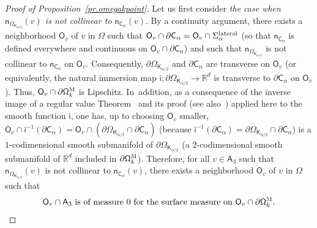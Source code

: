 \documentclass[JEP,XML,SOM,Unicode,NoEqCountersInSection,NoFloatCountersInSection,published]{cedram}
\let\pa\partial
\theoremstyle{plain}
\theoremstyle{definition}
\begin{document}
\begin{proof}[Proof of Proposition~\ref{pr.omegakpoint}]
Let us first consider \emph{the case when $\mathsf n_{\Omega_{\mathsf K_{\alpha/2}}}(v)$ is not collinear to $\mathsf n_{\mathsf C_\alpha}(v)$}. By a continuity argument, there exists a neighborhood $\mathsf O_v$ of $v$ in $\Omega$ such that $\mathsf O_v\cap \pa \mathsf C_\alpha=\mathsf O_v\cap \Sigma_\alpha^{\textup{lateral}}$ (so that $\mathsf n_{\mathsf C_\alpha}$ is defined everywhere and continuous on $\mathsf O_v\cap \pa \mathsf C_\alpha$) and such that $\mathsf n_{\Omega_{\mathsf K_{\alpha/2}}}$ is not collinear to $\mathsf n_{\mathsf C_\alpha}$ on $\mathsf O_v$. Consequently, $ \partial \Omega_{\mathsf K_{\alpha/2}}$ and $ \pa \mathsf C_\alpha$ are transverse on $\mathsf O_v$ (or equivalently, the natural immersion map $\mathsf i: \partial \Omega_{\mathsf K_{\alpha/2}}\to \mathbb R^d$ is transverse to $ \pa \mathsf C_\alpha$ on $\mathsf O_v$). Thus, $\mathsf O_v\cap \pa \mathsf \Omega_k^{\textsc{M}}$ is Lipschitz. In~addition, as a consequence of the inverse image of a regular value Theorem~\cite[Th.\,(5.12)]{brocker1982introduction} and its proof (see also~\cite{thom1954quelques,milnor1997topology,guillemin2010differential})
applied here to the smooth function $\mathsf i$, one has, up to choosing $\mathsf O_v$ smaller, $\mathsf O_v \cap \mathsf i^{-1}(\pa \mathsf C_\alpha)= \mathsf O_v\cap (\partial \Omega_{\mathsf K_{\alpha/2}}\cap \pa \mathsf C_\alpha)$ (because $\mathsf i^{-1}(\pa \mathsf C_\alpha)= \partial \Omega_{\mathsf K_{\alpha/2}}\cap \pa \mathsf C_\alpha$) is a $1$-codimensional smooth submanifold of $\partial \Omega_{\mathsf K_{\alpha/2}}$ (\ie a $2$-codimensional smooth submanifold of $\mathbb R^d$ included in $\pa \mathsf \Omega_k^{\textsc{M}}$).
Therefore, for all $v\in \mathsf A_3$ such that $\mathsf n_{\Omega_{\mathsf K_{\alpha/2}}}(v)$ is not collinear to $\mathsf n_{\mathsf C_\alpha}(v)$, there exists a neighborhood $\mathsf O_v$ of $v$ in $\Omega$ such that
\begin{equation}\label{eq.point1A3}
\text{$\mathsf O_v\cap \mathsf A_3$ is of measure $0$ for the surface measure on $\mathsf O_v\cap \pa \mathsf \Omega_k^{\textsc{M}}$}.
\end{equation}


\end{proof}
\end{document}
